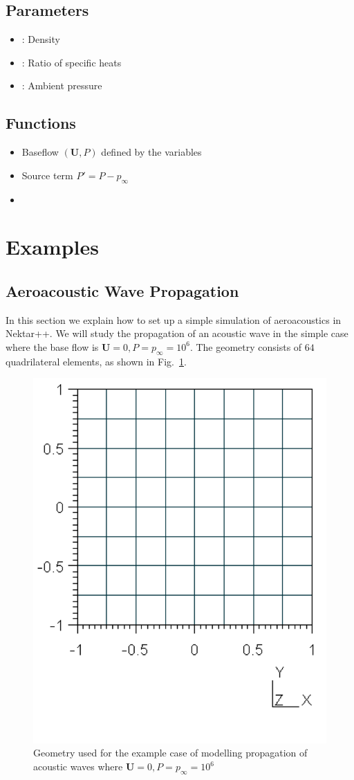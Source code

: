 \subsection{Parameters}
\begin{itemize}
\item {}: Density
\item {}: Ratio of specific heats
\item {}: Ambient pressure
\end{itemize}

\subsection{Functions}
\begin{itemize}
\item {} Baseflow $(\mathbf{U},P)$ defined by the variables 
\item {} Source term $P'=P-p_{\infty}$
\item {}
\end{itemize}


\section{Examples}
\subsection{Aeroacoustic Wave Propagation}
In this section we explain how to set up a simple simulation of aeroacoustics in
Nektar++. We will study the propagation of an acoustic wave in the simple case
where the base flow is $\mathbf{U}=0, P=p_{\infty}=10^6$. The geometry consists
of $64$ quadrilateral elements, as shown in Fig.~\ref{f:apesolver:geometry}.

\begin{figure}
	\centering
	\includegraphics[width=0.5\linewidth]{Figures/APE_Geometry.png}
	\caption{Geometry used for the example case of modelling propagation of
	acoustic waves where $\mathbf{U}=0, P=p_{\infty}=10^6$}
	\label{f:apesolver:geometry}
\end{figure}

